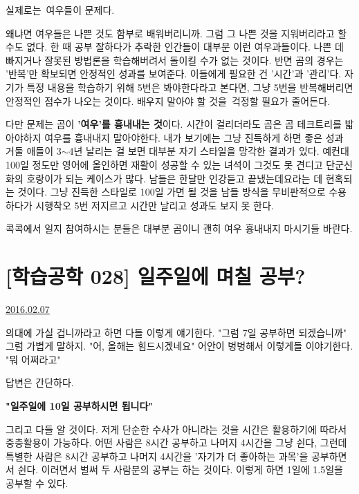 실제로는 여우들이 문제다.
\vspace{5mm}

왜냐면 여우들은 나쁜 것도 함부로 배워버리니까. 그럼 그 나쁜 것을 지워버리라고 할 수도 없다.
한 때 공부 잘하다가 추락한 인간들이 대부분 이런 여우과들이다. 나쁜 데 빠지거나 잘못된 방법론을 학습해버려서 돌이킬 수가 없는 것이다.
반면 곰의 경우는 '반복'만 확보되면 안정적인 성과를 보여준다. 이들에게 필요한 건 '시간'과 '관리'다.
자기가 특정 내용을 학습하기 위해 5번은 봐야한다라고 본다면, 그냥 5번을 반복해버리면 안정적인 점수가 나오는 것이다.
배우지 말아야 할 것을 걱정할 필요가 줄어든다.
\vspace{5mm}

다만 문제는 곰이 \textbf{'여우'를 흉내내는 것}이다.
시간이 걸리더라도 곰은 곰 테크트리를 밟아야하지 여우를 흉내내지 말아야한다.
내가 보기에는 그냥 진득하게 하면 좋은 성과 거둘 애들이 3$\sim$4년 날리는 걸 보면 대부분 자기 스타일을 망각한 결과가 있다.
예컨대 100일 정도만 영어에 올인하면 재활이 성공할 수 있는 녀석이 그것도 못 견디고 단군신화의 호랑이가 되는 케이스가 많다.
남들은 한달만 인강듣고 끝냈는데요라는 데 현혹되는 것이다.
그냥 진득한 스타일로 100일 가면 될 것을 남들 방식을 무비판적으로 수용하다가 시행착오 5번 저지르고 시간만 날리고 성과도 보지 못 한다.
\vspace{5mm}

콕콕에서 일지 참여하시는 분들은 대부분 곰이니 괜히 여우 흉내내지 마시기들 바란다.
\vspace{5mm}






\section{[학습공학 028] 일주일에 며칠 공부?}
\href{https://www.kockoc.com/Apoc/626695}{2016.02.07}

\vspace{5mm}

의대에 가실 겁니까라고 하면 다들 이렇게 얘기한다. "그럼 7일 공부하면 되겠습니까"
그럼 가볍게 말하지. "어, 올해는 힘드시겠네요"
어안이 벙벙해서 이렇게들 이야기한다. "뭐 어쩌라고"
\vspace{5mm}

답변은 간단하다.
\vspace{5mm}

\textbf{"일주일에 10일 공부하시면 됩니다"}
\vspace{5mm}

그리고 다들 알 것이다. 저게 단순한 수사가 아니라는 것을
시간은 활용하기에 따라서 중층활용이 가능하다.
어떤 사람은 8시간 공부하고 나머지 4시간을 그냥 쉰다,
그런데 특별한 사람은 8시간 공부하고 나머지 4시간을 '자기가 더 좋아하는 과목'을 공부하면서 쉰다.
이러면서 벌써 두 사람분의 공부는 하는 것이다. 이렇게 하면 1일에 1.5일을 공부할 수 있다.
\vspace{5mm}

